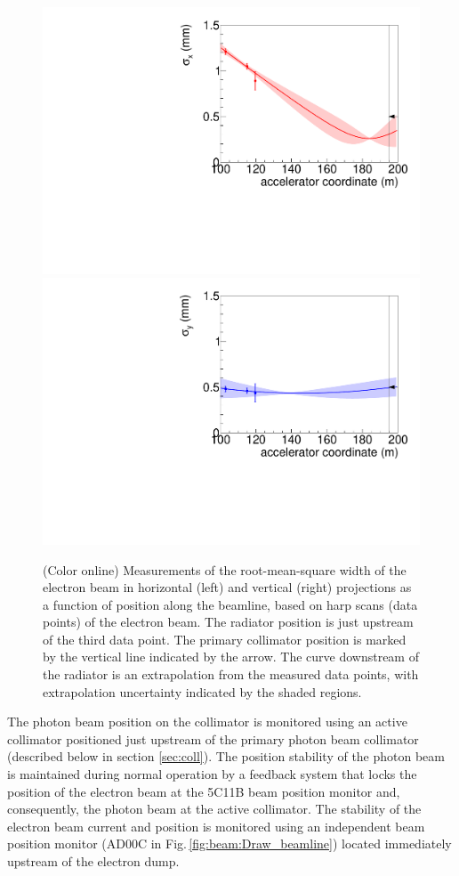 \begin{figure}[tbp]
\begin{center}
 \includegraphics[clip=true,width=0.49\linewidth]{figures/harp-x-767755.pdf}
 \includegraphics[clip=true,width=0.49\linewidth]{figures/harp-y-767755.pdf}
\end{center}
\caption{(Color online) Measurements of the root-mean-square width of the electron beam 
in horizontal (left)
and vertical (right) projections as a function of position along the beamline, based on
harp scans (data points) of the electron beam. The radiator position is just upstream
of the third data point. The primary collimator position is marked by the vertical line
indicated by the arrow. The curve downstream of the radiator is an extrapolation from
the measured data points, with extrapolation uncertainty indicated by the shaded regions.
        }
\label{fig:beam:convergence} 
\end{figure}

The photon beam position on the collimator is monitored using an active collimator positioned just upstream of the primary photon beam collimator
(described below in section \ref{sec:coll}). 
The position stability of the photon beam is maintained during normal
operation by a feedback system that locks the position of the electron
beam at the 5C11B beam position monitor and, consequently, the photon beam at the active collimator. The stability of the electron
beam current and position is monitored using an independent beam position monitor
(AD00C in Fig.\,\ref{fig:beam:Draw_beamline}) 
located immediately upstream of the electron dump.

